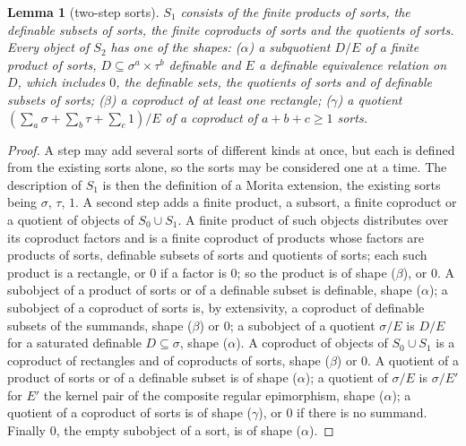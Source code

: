 \documentclass[11pt]{amsart}
\newtheorem{lem}[thm]{Lemma}
\theoremstyle{definition}
\begin{document}
\begin{lem}[two-step sorts]\label{lem:twostep}
$S_1$ consists of the finite products of sorts, the definable subsets
of sorts, the finite coproducts of sorts and the quotients of sorts.
Every object of $S_2$ has one of the shapes: ($\alpha$) a subquotient
$D/E$ of a finite product of sorts, $D\subseteq\sigma^a\times\tau^b$
definable and $E$ a definable equivalence relation on $D$, which
includes $0$, the definable sets, the quotients of sorts and of definable
subsets of sorts; ($\beta$) a coproduct of at least one rectangle;
($\gamma$) a quotient $(\sum_a\sigma+\sum_b\tau+\sum_c1)/E$ of a
coproduct of $a+b+c\ge1$ sorts.
\end{lem}
\begin{proof}
A step may add several sorts of different kinds at once, but each is
defined from the existing sorts alone, so the sorts may be considered
one at a time. The description of $S_1$ is then the definition of a
Morita extension, the existing sorts being $\sigma$, $\tau$, $1$. A
second step adds a finite product, a subsort, a finite coproduct or a
quotient of objects of $S_0\cup S_1$. A finite product of such objects distributes over its
coproduct factors and is a finite coproduct of products whose factors
are products of sorts, definable subsets of sorts and quotients of
sorts; each such product is a rectangle, or $0$ if a factor is $0$;
so the product is of shape ($\beta$), or $0$. A subobject of a product
of sorts or of a definable subset is definable, shape ($\alpha$); a
subobject of a coproduct of sorts is, by extensivity, a coproduct of
definable subsets of the summands, shape ($\beta$) or $0$; a subobject
of a quotient $\sigma/E$ is $D/E$ for a saturated definable
$D\subseteq\sigma$, shape ($\alpha$). A coproduct of objects of
$S_0\cup S_1$ is a coproduct of rectangles and of coproducts of sorts,
shape ($\beta$) or $0$. A quotient of a product of sorts or of a
definable subset is of shape ($\alpha$); a quotient of $\sigma/E$ is
$\sigma/E'$ for $E'$ the kernel pair of the composite regular
epimorphism, shape ($\alpha$); a quotient of a coproduct of sorts is of
shape ($\gamma$), or $0$ if there is no summand. Finally $0$, the
empty subobject of a sort, is of shape ($\alpha$).
\end{proof}
\end{document}
